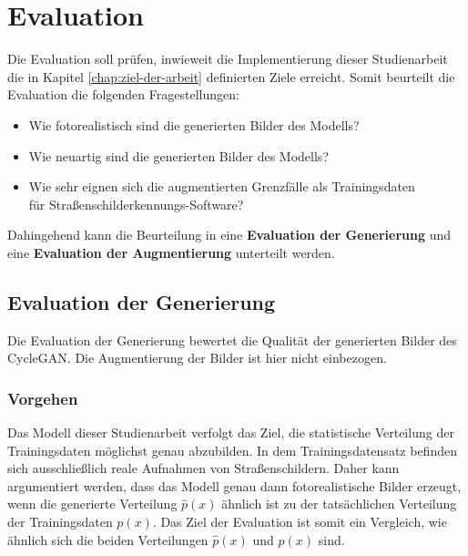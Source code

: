 \chapter{Evaluation}

Die Evaluation soll prüfen, inwieweit die Implementierung dieser Studienarbeit die in Kapitel \ref{chap:ziel-der-arbeit} definierten Ziele erreicht. Somit beurteilt die Evaluation die folgenden Fragestellungen:
\begin{itemize}
	\item Wie fotorealistisch sind die generierten Bilder des Modells? 
	\item Wie neuartig sind die generierten Bilder des Modells?
	\item Wie sehr eignen sich die augmentierten Grenzfälle als Trainingsdaten \\ für Straßenschilderkennungs-Software?
\end{itemize}

Dahingehend kann die Beurteilung in eine \textbf{Evaluation der Generierung} und eine \textbf{Evaluation der Augmentierung} unterteilt werden.

\label{chap:Evaluation}
\section{Evaluation der Generierung}

Die Evaluation der Generierung bewertet die Qualität der generierten Bilder des \ac{CycleGAN}. Die Augmentierung der Bilder ist hier nicht einbezogen.

\subsection{Vorgehen}

Das Modell dieser Studienarbeit verfolgt das Ziel, die statistische Verteilung der Trainingsdaten möglichst genau abzubilden. In dem Trainingsdatensatz befinden sich ausschließlich reale Aufnahmen von Straßenschildern. Daher kann argumentiert werden, dass das Modell genau dann fotorealistische Bilder erzeugt, wenn die generierte Verteilung $\hat{p}(x)$ ähnlich ist zu der tatsächlichen Verteilung der Trainingsdaten $p(x)$. Das Ziel der Evaluation ist somit ein Vergleich, wie ähnlich sich die beiden Verteilungen $\hat{p}(x)$ und $p(x)$ sind.

